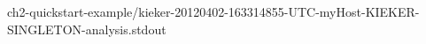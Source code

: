 \setTextListing

{ch2-quickstart-example/kieker-20120402-163314855-UTC-myHost-KIEKER-SINGLETON-analysis.stdout}
